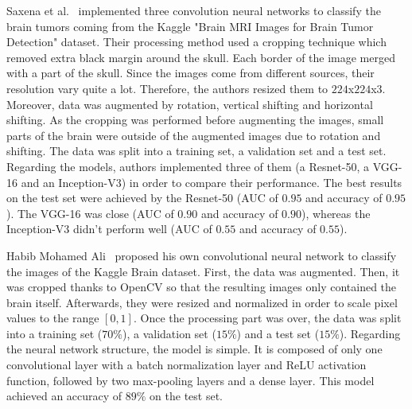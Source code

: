 Saxena et al.~\cite{31} implemented three convolution neural networks to classify the brain tumors coming from the Kaggle "Brain MRI Images for Brain Tumor Detection" dataset. Their processing method used a cropping technique which removed extra black margin around the skull. Each border of the image merged with a part of the skull. Since the images come from different sources, their resolution vary quite a lot. Therefore, the authors resized them to $224$x$224$x$3$. Moreover, data was augmented by rotation, vertical shifting and horizontal shifting. As the cropping was performed before augmenting the images, small parts of the brain were outside of the augmented images due to rotation and shifting. The data was split into a training set, a validation set and a test set. Regarding the models, authors implemented three of them (a Resnet-50, a VGG-16 and an Inception-V3) in order to compare their performance. The best results on the test set were achieved by the Resnet-50 (AUC of $0.95$ and accuracy of $0.95$). The VGG-16 was close (AUC of $0.90$ and accuracy of $0.90$), whereas the Inception-V3 didn't perform well (AUC of $0.55$ and accuracy of $0.55$).


Habib Mohamed Ali~\cite{04} proposed his own convolutional neural network to classify the images of the Kaggle Brain dataset. First, the data was augmented. Then, it was cropped thanks to OpenCV so that the resulting images only contained the brain itself. Afterwards, they were resized and normalized in order to scale pixel values to the range $[0,1]$. Once the processing part was over, the data was split into a training set ($70\%$), a validation set ($15\%$) and a test set ($15\%$). Regarding the neural network structure, the model is simple. It is composed of only one convolutional layer with a batch normalization layer and ReLU activation function, followed by two max-pooling layers and a dense layer. This model achieved an accuracy of $89\%$ on the test set.

